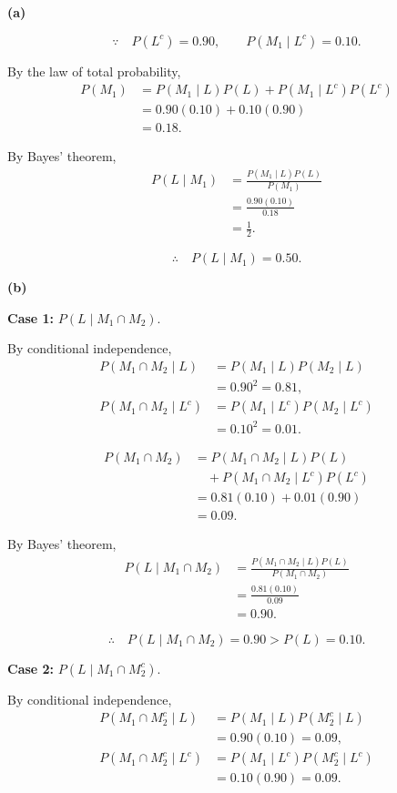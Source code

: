 \documentclass[11pt,a4paper]{article}
\begin{document}
\noindent
\textbf{(a)}

\[
\because\quad
P(L^c)=0.90,\qquad
P(M_1\mid L^c)=0.10.
\]

By the law of total probability,
\begin{align*}
P(M_1)
&=P(M_1\mid L)P(L)
 +P(M_1\mid L^c)P(L^c)\\
&=0.90(0.10)+0.10(0.90)\\
&=0.18.
\end{align*}

By Bayes' theorem,
\begin{align*}
P(L\mid M_1)
&=\frac{P(M_1\mid L)P(L)}{P(M_1)}\\
&=\frac{0.90(0.10)}{0.18}\\
&=\frac{1}{2}.
\end{align*}

\[
\therefore\quad P(L\mid M_1)=0.50.
\]


\bigskip
\noindent
\textbf{(b)}

\textbf{Case 1:} $P(L\mid M_1\cap M_2)$.

By conditional independence,
\begin{align*}
P(M_1\cap M_2\mid L)
&=P(M_1\mid L)P(M_2\mid L)\\
&=0.90^2=0.81,\\[4pt]
P(M_1\cap M_2\mid L^c)
&=P(M_1\mid L^c)P(M_2\mid L^c)\\
&=0.10^2=0.01.
\end{align*}

\begin{align*}
P(M_1\cap M_2)
&=P(M_1\cap M_2\mid L)P(L)\\
&\quad+P(M_1\cap M_2\mid L^c)P(L^c)\\
&=0.81(0.10)+0.01(0.90)\\
&=0.09.
\end{align*}

By Bayes' theorem,
\begin{align*}
P(L\mid M_1\cap M_2)
&=\frac{P(M_1\cap M_2\mid L)P(L)}
{P(M_1\cap M_2)}\\
&=\frac{0.81(0.10)}{0.09}\\
&=0.90.
\end{align*}

\[
\therefore\quad
P(L\mid M_1\cap M_2)=0.90>P(L)=0.10.
\]


\medskip
\textbf{Case 2:} $P(L\mid M_1\cap M_2^c)$.

By conditional independence,
\begin{align*}
P(M_1\cap M_2^c\mid L)
&=P(M_1\mid L)P(M_2^c\mid L)\\
&=0.90(0.10)=0.09,\\[4pt]
P(M_1\cap M_2^c\mid L^c)
&=P(M_1\mid L^c)P(M_2^c\mid L^c)\\
&=0.10(0.90)=0.09.
\end{align*}
\end{document}

